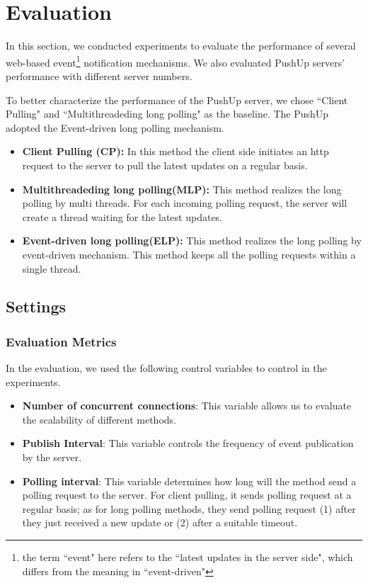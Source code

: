 \section {Evaluation\\}
 
In this section, we conducted experiments to evaluate the performance of 
several web-based event\footnote{the term ``event" here refers to the ``latest 
updates in the server side", which differs from the meaning in ``event-driven"
} notification mechanisms. We also evaluated PushUp servers' performance with
different server numbers.

To better characterize the performance of the PushUp server, we chose ``Client
Pulling" and ``Multithreadeding long polling" as the baseline. The PushUp
adopted the Event-driven long polling mechanism.

\begin{itemize}
    \item {\bf Client Pulling (CP): } In this method the client side initiates 
        an http request to the server to pull the latest updates on a regular 
        basis.
    \item {\bf Multithreadeding long polling(MLP): } This method realizes the 
        long polling by multi threads. For each incoming polling request, the
        server will create a thread waiting for the latest updates.
    \item {\bf Event-driven long polling(ELP): } This method realizes the long
        polling by event-driven mechanism. This method keeps all the polling 
        requests within a single thread.
\end{itemize}

\subsection{Settings \\}

\subsubsection{Evaluation Metrics \\}
In the evaluation, we used the following control variables to control in
the experiments.

\begin{itemize}
    \item {\bf Number of concurrent connections}: This variable allows us 
         to evaluate the scalability of different methods.
    \item {\bf Publish Interval}: This variable controls the frequency of 
         event publication by the server. 
    \item {\bf Polling interval}: This variable determines how long will 
        the method send a polling request to the server. For client 
        pulling, it sends polling request at a regular basis; as for
        long polling methods, they send polling request (1) after they
        just received a new update or (2) after a suitable timeout.
\end{itemize}


